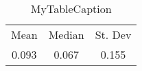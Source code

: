 \documentclass[10pt]{article}
\begin{document}
\begin{table}
\centering
\begin{tabular}{ccc}
Mean & Median & St. Dev \\
0.093 & 0.067 & 0.155 \\
\end{tabular}
\caption{MyTableCaption}
\label{table:MyTableLabel}
\end{table}
\end{document}
